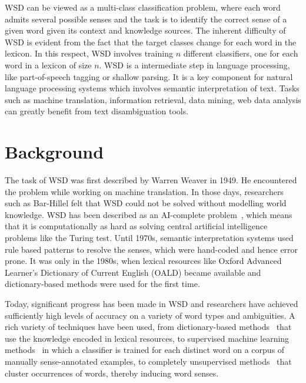 \documentclass[12pt,letterpaper]{article}
\newcommand{\blue}[1]{\textcolor{RoyalBlue}{#1}}
\newcommand{\instructions}[1]{\blue{\textit{#1}}}
\begin{document}
WSD can be viewed as a multi-class classification problem, where each word admits several possible senses and the task is to identify the correct sense of a given word given its context and knowledge sources. The inherent difficulty of WSD is evident from the fact that the target classes change for each word in the lexicon. In this respect, WSD involves training $n$ different classifiers, one for each word in a lexicon of size $n$. 
WSD is a intermediate step in language processing, like part-of-speech tagging or shallow parsing. It is a key component for natural language processing systems which involves semantic interpretation of text. Tasks such as machine translation, information retrieval, data mining, web data analysis can greatly benefit from text disambiguation tools. 


\section{Background}
\label{sec:background}

The task of WSD was first described by Warren Weaver in 1949. He encountered the problem while working on machine translation. In those days, researchers such as Bar-Hillel felt that WSD could not be solved without modelling world knowledge. WSD has been described as an AI-complete problem~\cite{mallery1988thinking}, which means that it is computationally as hard as solving central artificial intelligence problems like the Turing test. Until 1970s, semantic interpretation systems used rule based patterns to resolve the senses, which were hand-coded and hence error prone. It was only in the 1980s, when lexical resources like Oxford Advanced Learner's Dictionary of Current English (OALD) became available and dictionary-based methods were used for the first time. 

Today, significant progress has been made in WSD and researchers have achieved sufficiently high levels of accuracy on a variety of word types and ambiguities. A rich variety of techniques have been used, from dictionary-based methods~\cite{mihalcea2007using} that use the knowledge encoded in lexical resources, to supervised machine learning methods~\cite{manning1999foundations} in which a classifier is trained for each distinct word on a corpus of manually sense-annotated examples, to completely unsupervised methods~\cite{yarowsky1995unsupervised} that cluster occurrences of words, thereby inducing word senses.
\end{document}
